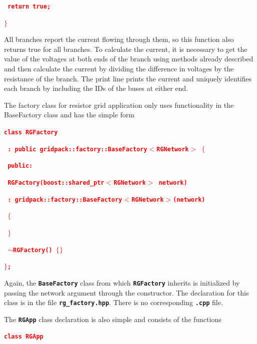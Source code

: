 \documentclass[12pt]{report} %
\begin{document}
\textcolor{red}{\texttt{\textbf{  return true;}}}

\textcolor{red}{\texttt{\textbf{$\boldsymbol{\mathrm{\}}}$}}}

All branches report the current flowing through them, so this function also returns true for all branches. To calculate the current, it is necessary to get the value of the voltages at both ends of the branch using methods already described and then calculate the current by dividing the difference in voltages by the resistance of the branch. The print line prints the current and uniquely identifies each branch by including the IDs of the buses at either end.

The factory class for resistor grid application only uses functionality in the BaseFactory class and has the simple form

\textcolor{red}{\texttt{\textbf{class RGFactory}}}

\textcolor{red}{\texttt{\textbf{  : public gridpack::factory::BaseFactory$\boldsymbol{\mathrm{<}}$RGNetwork$\boldsymbol{\mathrm{>}}$ $\boldsymbol{\mathrm{\{}}$}}}

\textcolor{red}{\texttt{\textbf{  public:}}}

\textcolor{red}{\texttt{\textbf{    RGFactory(boost::shared\_ptr$\boldsymbol{\mathrm{<}}$RGNetwork$\boldsymbol{\mathrm{>}}$ network)}}}

\textcolor{red}{\texttt{\textbf{      : gridpack::factory::BaseFactory$\boldsymbol{\mathrm{<}}$RGNetwork$\boldsymbol{\mathrm{>}}$(network)}}}

\textcolor{red}{\texttt{\textbf{    $\boldsymbol{\mathrm{\{}}$}}}

\textcolor{red}{\texttt{\textbf{    $\boldsymbol{\mathrm{\}}}$}}}

\textcolor{red}{\texttt{\textbf{    $\boldsymbol{\mathrm{\sim}}$RGFactory() $\boldsymbol{\mathrm{\{}}$$\boldsymbol{\mathrm{\}}}$}}}

\textcolor{red}{\texttt{\textbf{$\boldsymbol{\mathrm{\}}}$;}}}

Again, the \texttt{\textbf{BaseFactory}} class from which \texttt{\textbf{RGFactory}} inherits is initialized by passing the network argument through the constructor. The declaration for this class is in the file \texttt{\textbf{rg\_factory.hpp}}. There is no corresponding \texttt{\textbf{.cpp}} file.

The \texttt{\textbf{RGApp}} class declaration is also simple and consists of the functions

\textcolor{red}{\texttt{\textbf{class RGApp}}}
\end{document}
